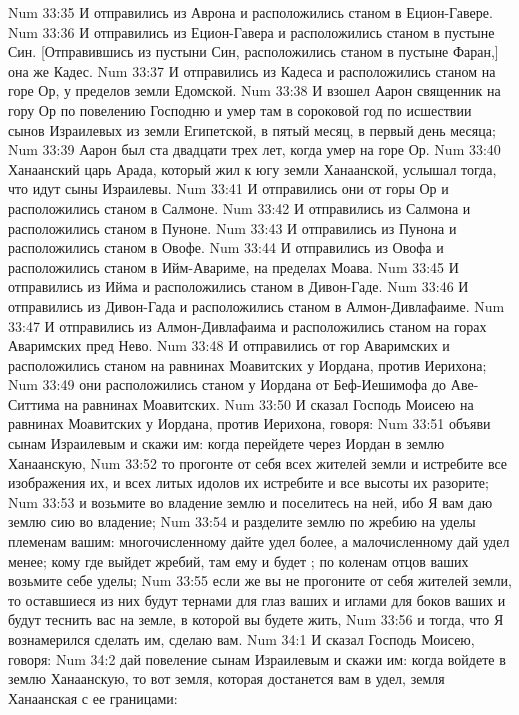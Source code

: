 \vs Num 33:35 И отправились из Аврона и расположились станом в Ецион-Гавере.
\vs Num 33:36 И отправились из Ецион-Гавера и расположились станом в пустыне Син. [Отправившись из пустыни Син, расположились станом в пустыне Фаран,] она же Кадес.
\vs Num 33:37 И отправились из Кадеса и расположились станом на горе Ор, у пределов земли Едомской.
\vs Num 33:38 И взошел Аарон священник на гору Ор по повелению Господню и умер там в сороковой год по исшествии сынов Израилевых из земли Египетской, в пятый месяц, в первый день месяца;
\vs Num 33:39 Аарон был ста двадцати трех лет, когда умер на горе Ор.
\rsbpar\vs Num 33:40 Ханаанский царь Арада, который жил к югу земли Ханаанской, услышал тогда, что идут сыны Израилевы.
\vs Num 33:41 И отправились они от горы Ор и расположились станом в Салмоне.
\vs Num 33:42 И отправились из Салмона и расположились станом в Пуноне.
\vs Num 33:43 И отправились из Пунона и расположились станом в Овофе.
\vs Num 33:44 И отправились из Овофа и расположились станом в Ийм-Авариме, на пределах Моава.
\vs Num 33:45 И отправились из Ийма и расположились станом в Дивон-Гаде.
\vs Num 33:46 И отправились из Дивон-Гада и расположились станом в Алмон-Дивлафаиме.
\vs Num 33:47 И отправились из Алмон-Дивлафаима и расположились станом на горах Аваримских пред Нево.
\vs Num 33:48 И отправились от гор Аваримских и расположились станом на равнинах Моавитских у Иордана, против Иерихона;
\vs Num 33:49 они расположились станом у Иордана от Беф-Иешимофа до Аве-Ситтима на равнинах Моавитских.
\rsbpar\vs Num 33:50 И сказал Господь Моисею на равнинах Моавитских у Иордана, против Иерихона, говоря:
\vs Num 33:51 объяви сынам Израилевым и скажи им: когда перейдете через Иордан в землю Ханаанскую,
\vs Num 33:52 то прогонте от себя всех жителей земли и истребите все изображения их, и всех литых идолов их истребите и все высоты их разорите;
\vs Num 33:53 и возьмите во владение землю и поселитесь на ней, ибо Я вам даю землю сию во владение;
\vs Num 33:54 и разделите землю по жребию на уделы племенам вашим: многочисленному дайте удел более, а малочисленному дай удел менее; кому где выйдет жребий, там ему и будет ; по коленам отцов ваших возьмите себе уделы;
\vs Num 33:55 если же вы не прогоните от себя жителей земли, то оставшиеся из них будут тернами для глаз ваших и иглами для боков ваших и будут теснить вас на земле, в которой вы будете жить,
\vs Num 33:56 и тогда, что Я вознамерился сделать им, сделаю вам.
\vs Num 34:1 И сказал Господь Моисею, говоря:
\vs Num 34:2 дай повеление сынам Израилевым и скажи им: когда войдете в землю Ханаанскую, то вот земля, которая достанется вам в удел, земля Ханаанская с ее границами:
